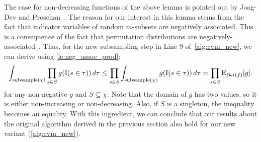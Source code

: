 The case for non-decreasing functions of the above lemma is pointed out by Joag-Dev and Proschan~\cite[P.2]{joagdev1983}.
The reason for our interest in this lemma stems from the fact that indicator variables of random $m$-subsets are negatively associated.
This is a consequence of the fact that permutation distributions are negatively-associated~\cite[Th. 2.11]{joagdev1983}.
Thus, for the new subsampling step in Line 9 of~\cref{alg:cvm_new}, we can derive using \cref{le:neg_assoc_prod}:
\begin{equation}\label{eq:subsample_with_n_subsets}
  \int_{\mathrm{subsample}(\chi)} \prod_{s \in S} g(\operatorname{\mathrm{I}}(s \in \tau))\,d\tau \leq
  \prod_{s \in S} \int_{\mathrm{subsample}(\chi)} g(\operatorname{\mathrm{I}}(s \in \tau))\,d\tau = \prod_{s \in S}  \operatorname{\mathrm{E}}_{\operatorname{\mathrm{Ber}}(f)}[g] \textrm{.}
\end{equation}
for any non-negative $g$ and $S \subseteq \chi$.
Note that the domain of $g$ has two values, so it is either non-increasing or non-decreasing.
Also, if $S$ is a singleton, the inequality becomes an equality.
With this ingredient, we can conclude that our results about the original algorithm derived in the previous section also hold for our new variant (\cref{alg:cvm_new}).
